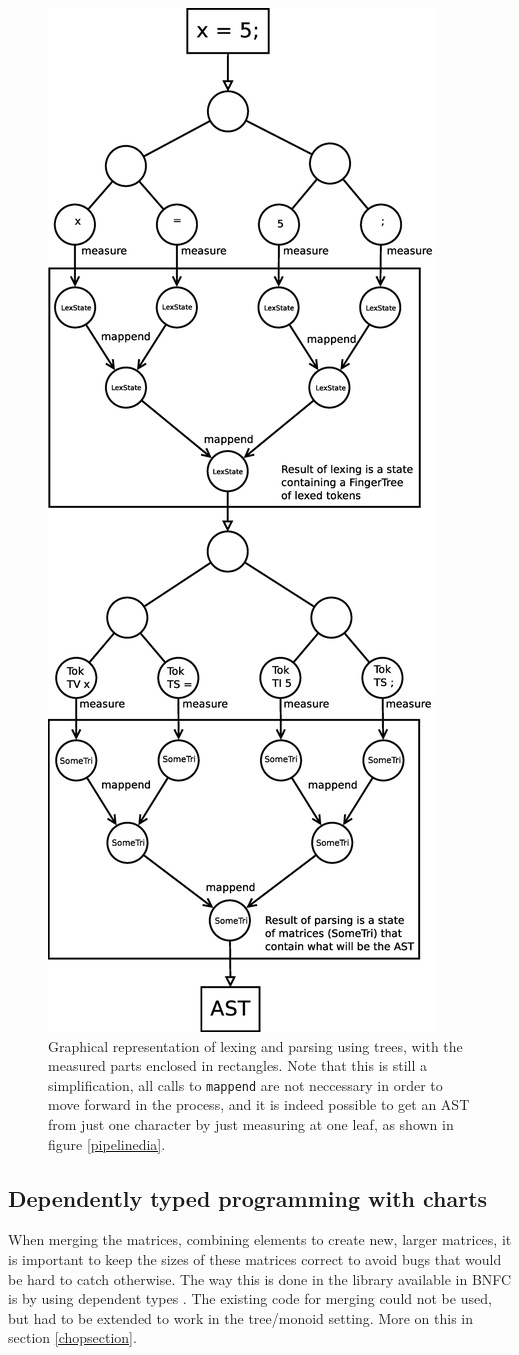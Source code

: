 \documentclass[a4paper,12pt,twosided]{report}
\renewcommand\cite{\citep}
\begin{document}
\begin{figure}[H]
\centering
\includegraphics[width=.5\textwidth]{tree.eps}
\caption{\label{treemeasure}Graphical representation of lexing and parsing using
trees, with the measured parts enclosed in rectangles. Note that this is still a
simplification, all calls to \texttt{mappend} are not neccessary in order to
move forward in the process, and it is indeed possible to get an AST from just
one character by just measuring at one leaf, as shown in figure
\ref{pipelinedia}.}
\end{figure}

\subsection{Dependently typed programming with charts}
When merging the matrices, combining elements to create new, larger matrices, it
is important to keep the sizes of these matrices correct to avoid bugs that
would be hard to catch otherwise. The way this is done in the library available
in BNFC is by using dependent types \cite{jyp-bnfc}. The existing code for
merging could not be used, but had to be extended to work in the tree/monoid
setting. More on this in section \ref{chopsection}.
\end{document}

